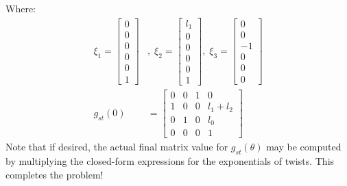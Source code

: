 \documentclass[oneside]{book}
\begin{document}
Where:
\begin{align}
    \xi_1 = \begin{bmatrix}
       0\\
       0\\
       0\\
       0\\
       0\\
       1
    \end{bmatrix}&, \; 
    \xi_2 = \begin{bmatrix}
    l_1\\
    0\\
    0\\
    0\\
    0\\
    1
    \end{bmatrix}, \; 
    \xi_3 = \begin{bmatrix}
    0\\
    0\\
    -1\\
    0\\
    0\\
    0
    \end{bmatrix}\\
    g_{st}(0) &= \begin{bmatrix}
        0 & 0 & 1 & 0\\
        1 & 0 & 0 & l_1 + l_2\\
        0 & 1 & 0 & l_0\\
        0 & 0 & 0 & 1
    \end{bmatrix}
\end{align}
Note that if desired, the actual final matrix value for $g_{st}(\theta)$ may be computed by multiplying the closed-form expressions for the exponentials of twists. This completes the problem!
\end{document}
